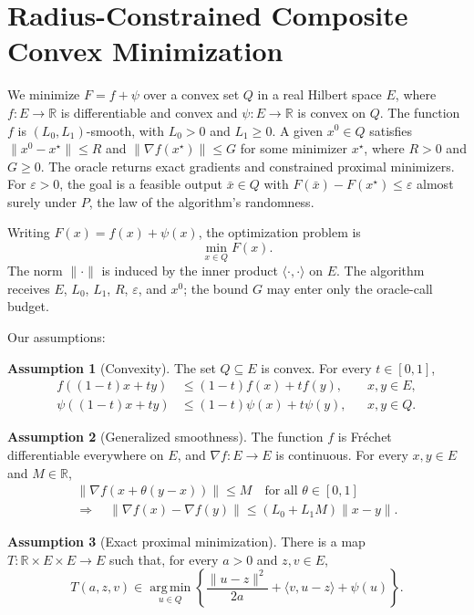 \documentclass[10pt]{article}
\theoremstyle{definition}
\newtheorem{assumption}{Assumption}
\begin{document}
\section*{Radius-Constrained Composite Convex Minimization}
We minimize $F=f+\psi$ over a convex set $Q$ in a real Hilbert space $E$, where $f:E\to\mathbb{R}$ is differentiable and convex and $\psi:E\to\mathbb{R}$ is convex on $Q$. The function $f$ is $(L_0,L_1)$-smooth, with $L_0>0$ and $L_1\geq0$. A given $x^0\in Q$ satisfies $\|x^0-x^\star\|\leq R$ and $\|\nabla f(x^\star)\|\leq G$ for some minimizer $x^\star$, where $R>0$ and $G\geq0$. The oracle returns exact gradients and constrained proximal minimizers. For $\varepsilon>0$, the goal is a feasible output $\bar{x}\in Q$ with $F(\bar{x})-F(x^\star)\leq\varepsilon$ almost surely under $P$, the law of the algorithm's randomness.

Writing $F(x)=f(x)+\psi(x)$, the optimization problem is
\[
\min_{x\in Q} F(x).
\]
The norm $\|\cdot\|$ is induced by the inner product $\langle\cdot,\cdot\rangle$ on $E$. The algorithm receives $E$, $L_0$, $L_1$, $R$, $\varepsilon$, and $x^0$; the bound $G$ may enter only the oracle-call budget.

Our assumptions:
\begin{assumption}[Convexity]
The set $Q\subseteq E$ is convex. For every $t\in[0,1]$,
\[
\begin{aligned}
f((1-t)x+ty)&\leq(1-t)f(x)+tf(y),
&&x,y\in E,\\
\psi((1-t)x+ty)&\leq(1-t)\psi(x)+t\psi(y),
&&x,y\in Q.
\end{aligned}
\]
\end{assumption}

\begin{assumption}[Generalized smoothness]
The function $f$ is Fr\'echet differentiable everywhere on $E$, and $\nabla f:E\to E$ is continuous. For every $x,y\in E$ and $M\in\mathbb{R}$,
\[
\begin{gathered}
\|\nabla f(x+\theta(y-x))\|\leq M
\quad\text{for all }\theta\in[0,1]\\
\Longrightarrow\quad
\|\nabla f(x)-\nabla f(y)\|
\leq (L_0+L_1M)\|x-y\|.
\end{gathered}
\]
\end{assumption}

\begin{assumption}[Exact proximal minimization]
There is a map $T:\mathbb{R}\times E\times E\to E$ such that, for every $a>0$ and $z,v\in E$,
\[
T(a,z,v)\in\operatorname*{arg\,min}_{u\in Q}
\left\{
\frac{\|u-z\|^2}{2a}
+\langle v,u-z\rangle+\psi(u)
\right\}.
\]
\end{assumption}
\end{document}
